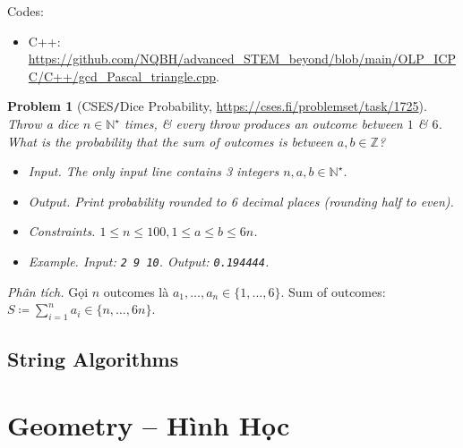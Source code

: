 \documentclass{article}
\newtheorem{problem}{Problem}
\begin{document}
Codes:
\begin{itemize}
	\item C++: \url{https://github.com/NQBH/advanced_STEM_beyond/blob/main/OLP_ICPC/C++/gcd_Pascal_triangle.cpp}.
\end{itemize}

\begin{problem}[CSES{\tt/}Dice Probability, \url{https://cses.fi/problemset/task/1725}]
	Throw a dice $n\in\mathbb{N}^\star$ times, \& every throw produces an outcome between $1$ \& $6$. What is the probability that the sum of outcomes is between $a,b\in\mathbb{Z}$?
	\begin{itemize}
		\item {\sf Input.} The only input line contains 3 integers $n,a,b\in\mathbb{N}^\star$.
		\item {\sf Output.} Print probability rounded to 6 decimal places (rounding half to even).
		\item {\sf Constraints.} $1\le n\le100,1\le a\le b\le6n$.
		\item {\sf Example.} Input: {\tt2 9 10}. Output: {\tt0.194444}.
	\end{itemize}
\end{problem}
{\it Phân tích.} Gọi $n$ outcomes là $a_1,\ldots,a_n\in\{1,\ldots,6\}$. Sum of outcomes: $S\coloneqq\sum_{i=1}^n a_i\in\{n,\ldots,6n\}$.

\subsection{String Algorithms}


\section{Geometry -- Hình Học}
\end{document}
